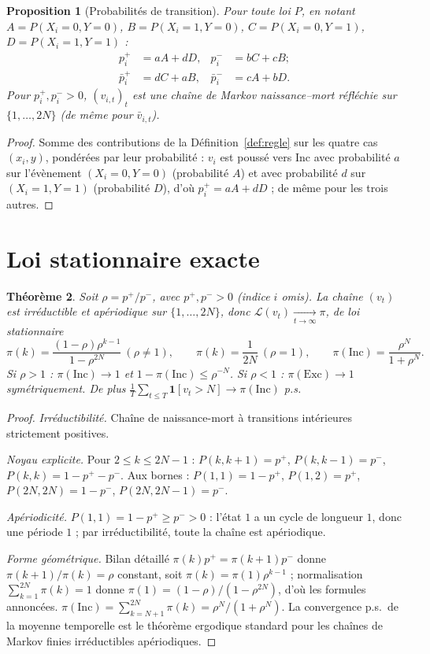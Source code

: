 \documentclass[12pt,a4paper]{article}
\newtheorem{theorem}{Théorème}
\newtheorem{proposition}[theorem]{Proposition}
\theoremstyle{remark}
\newcommand{\Inc}{\ensuremath{\mathrm{Inc}}}
\newcommand{\Exc}{\ensuremath{\mathrm{Exc}}}
\newcommand{\vbar}{\bar{v}}
\begin{document}
\begin{proposition}[Probabilités de transition]\label{prop:pv}
Pour toute loi $P$, en notant $A=P(X_i{=}0,Y{=}0)$, $B=P(X_i{=}1,Y{=}0)$,
$C=P(X_i{=}0,Y{=}1)$, $D=P(X_i{=}1,Y{=}1)$ :
\begin{align*}
  p_i^+ &= aA+dD, & p_i^- &= bC+cB; \\
  \bar p_i^+ &= dC+aB, & \bar p_i^- &= cA+bD.
\end{align*}
Pour $p_i^+,p_i^->0$, $(v_{i,t})_t$ est une chaîne de Markov naissance--mort
réfléchie sur $\{1,\ldots,2N\}$ (de même pour $\vbar_{i,t}$).
\end{proposition}

\begin{proof}
Somme des contributions de la Définition~\ref{def:regle} sur les quatre cas
$(x_i,y)$, pondérées par leur probabilité : $v_i$ est poussé vers $\Inc$ avec
probabilité $a$ sur l'évènement $(X_i{=}0,Y{=}0)$ (probabilité $A$) et avec
probabilité $d$ sur $(X_i{=}1,Y{=}1)$ (probabilité $D$), d'où $p_i^+=aA+dD$ ;
de même pour les trois autres.
\end{proof}

\section{Loi stationnaire exacte}

\begin{theorem}\label{thm:stat}
Soit $\rho=p^+/p^-$, avec $p^+,p^->0$ (indice $i$ omis). La chaîne $(v_t)$
est irréductible et apériodique sur $\{1,\ldots,2N\}$, donc
$\mathcal L(v_t)\xrightarrow[t\to\infty]{}\pi$, de loi stationnaire
\[
  \pi(k) = \frac{(1-\rho)\rho^{k-1}}{1-\rho^{2N}}\ (\rho\ne1), \qquad
  \pi(k) = \frac1{2N}\ (\rho=1), \qquad
  \pi(\Inc) = \frac{\rho^N}{1+\rho^N}.
\]
Si $\rho>1$ : $\pi(\Inc)\to1$ et $1-\pi(\Inc)\le\rho^{-N}$. Si $\rho<1$ :
$\pi(\Exc)\to1$ symétriquement. De plus $\frac1T\sum_{t\le T}\mathbf1[v_t>N]\to\pi(\Inc)$ p.s.
\end{theorem}

\begin{proof}
\emph{Irréductibilité.} Chaîne de naissance-mort à transitions intérieures
strictement positives.

\emph{Noyau explicite.} Pour $2\le k\le 2N-1$ : $P(k,k{+}1)=p^+$,
$P(k,k{-}1)=p^-$, $P(k,k)=1-p^+-p^-$. Aux bornes : $P(1,1)=1-p^+$,
$P(1,2)=p^+$, $P(2N,2N)=1-p^-$, $P(2N,2N{-}1)=p^-$.

\emph{Apériodicité.} $P(1,1)=1-p^+\ge p^->0$ : l'état $1$ a un cycle de
longueur $1$, donc une période $1$ ; par irréductibilité, toute la chaîne
est apériodique.

\emph{Forme géométrique.} Bilan détaillé $\pi(k)p^+=\pi(k{+}1)p^-$ donne
$\pi(k{+}1)/\pi(k)=\rho$ constant, soit $\pi(k)=\pi(1)\rho^{k-1}$ ;
normalisation $\sum_{k=1}^{2N}\pi(k)=1$ donne $\pi(1)=(1-\rho)/(1-\rho^{2N})$,
d'où les formules annoncées. $\pi(\Inc)=\sum_{k=N+1}^{2N}\pi(k)=\rho^N/(1+\rho^N)$.
La convergence p.s.\ de la moyenne temporelle est le théorème ergodique
standard pour les chaînes de Markov finies irréductibles apériodiques.
\end{proof}
\end{document}
